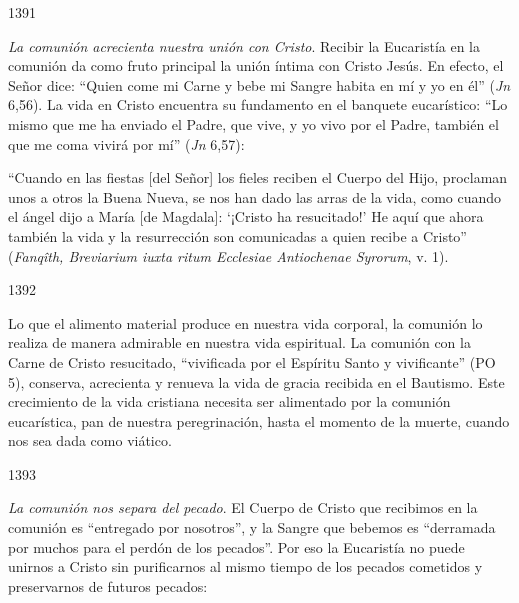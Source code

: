 			\begin{ccebody}\begin{ccenumber}1391\end{ccenumber} \textit{La comunión acrecienta nuestra unión con Cristo}. Recibir la Eucaristía en la comunión da como fruto principal la unión íntima con Cristo Jesús. En efecto, el Señor dice: “Quien come mi Carne y bebe mi Sangre habita en mí y yo en él” (\textit{Jn} 6,56). La vida en Cristo encuentra su fundamento en el banquete eucarístico: “Lo mismo que me ha enviado el Padre, que vive, y yo vivo por el Padre, también el que me coma vivirá por mí” (\textit{Jn} 6,57):\end{ccebody}
			
			\begin{ccecite}“Cuando en las fiestas [del Señor] los fieles reciben el Cuerpo del Hijo, proclaman unos a otros la Buena Nueva, se nos han dado las arras de la vida, como cuando el ángel dijo a María [de Magdala]: ‘¡Cristo ha resucitado!’ He aquí que ahora también la vida y la resurrección son comunicadas a quien recibe a Cristo” (\textit{Fanqîth, Breviarium iuxta ritum Ecclesiae Antiochenae Syrorum}, v. 1).\end{ccecite}
			
			\begin{ccebody}\begin{ccenumber}1392\end{ccenumber} Lo que el alimento material produce en nuestra vida corporal, la comunión lo realiza de manera admirable en nuestra vida espiritual. La comunión con la Carne de Cristo resucitado, “vivificada por el Espíritu Santo y vivificante” (PO 5), conserva, acrecienta y renueva la vida de gracia recibida en el Bautismo. Este crecimiento de la vida cristiana necesita ser alimentado por la comunión eucarística, pan de nuestra peregrinación, hasta el momento de la muerte, cuando nos sea dada como viático.\end{ccebody}
			
			\begin{ccebody}\begin{ccenumber}1393\end{ccenumber} \textit{La comunión nos separa del pecado}. El Cuerpo de Cristo que recibimos en la comunión es “entregado por nosotros”, y la Sangre que bebemos es “derramada por muchos para el perdón de los pecados”. Por eso la Eucaristía no puede unirnos a Cristo sin purificarnos al mismo tiempo de los pecados cometidos y preservarnos de futuros pecados:\end{ccebody}
			
